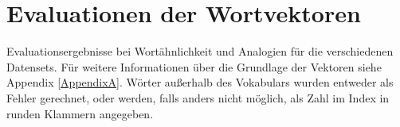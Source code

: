 
\chapter{Evaluationen der Wortvektoren} %

\label{AppendixB} %

Evaluationsergebnisse bei Wortähnlichkeit und Analogien für die verschiedenen Datensets.
Für weitere Informationen über die Grundlage der Vektoren siehe Appendix \ref{AppendixA}.
Wörter außerhalb des Vokabulars wurden entweder als Fehler gerechnet, oder
werden, falls anders nicht möglich, als Zahl im Index in runden Klammern angegeben.

\vspace{0.5cm}

